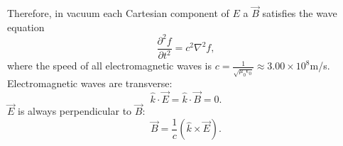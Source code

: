 \documentclass[11pt, a4paper]{article}
\begin{document}
Therefore, in vacuum each Cartesian component of $E$ a $\vec{B}$ satisfies the wave equation
$$
\frac{\partial^2f}{\partial t^2}=c^2\nabla^2f,
$$
where the speed of all electromagnetic waves is
$c= \frac 1{\sqrt {\mu_0\epsilon_0}}\approx 3.00\times 10^8$m/s.
Electromagnetic waves are transverse:
$$
\hat{k}\cdot\vec{E}=\hat{k}\cdot\vec{B}=0.
$$
$\vec{E}$ is always perpendicular to $\vec{B}$:
$$
\vec{B}=\frac1c(\hat{k}\times\vec{E}).
$$
\end{document}
